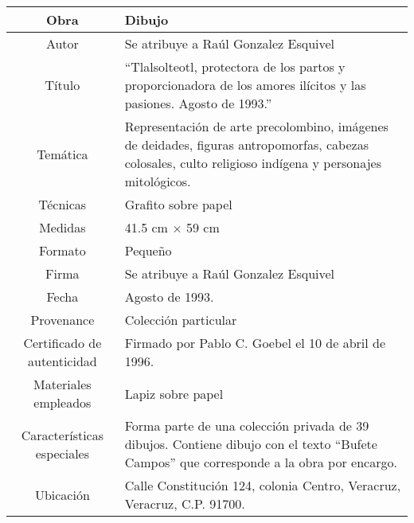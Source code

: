 \documentclass[10pt,letter]{report}
\begin{document}
\begin{table}[H]
\centering
\begin{tabular}{|c|m{}|}
\hline
Obra& Dibujo	\\
\hline
Autor & Se atribuye a Ra\'ul Gonzalez Esquivel\\
\hline
T\'itulo & ``Tlalsolteotl, protectora de los partos y proporcionadora de los amores il\'icitos y las pasiones. Agosto de 1993.''\\
\hline
Tem\'atica & Representaci\'on de arte precolombino, im\'agenes de deidades, figuras antropomorfas, cabezas colosales, culto religioso ind\'igena y personajes mitol\'ogicos.\\
\hline
T\'ecnicas &Grafito sobre papel \\
\hline
Medidas & 41.5 cm $\times$ 59 cm \\
\hline
 Formato & Peque\~no \\
 \hline
 Firma & Se atribuye a Ra\'ul Gonzalez Esquivel\\ 
 \hline
  Fecha & Agosto de 1993.\\
 \hline
 Provenance & Colecci\'on particular\\
 \hline
 Certificado de autenticidad& Firmado por Pablo C. Goebel el 10 de abril de 1996.  \\
 \hline 
  Materiales empleados & Lapiz sobre papel\\
 \hline
 Caracter\'isticas especiales & Forma parte de una colecci\'on privada de 39 dibujos. 
Contiene dibujo con el texto ``Bufete Campos'' que corresponde a la obra por encargo. \\
\hline 
Ubicaci\'on & Calle Constituci\'on 124, colonia Centro, Veracruz, Veracruz, C.P. 91700.\\
\hline

\end{tabular}
\end{table}
\end{document}

